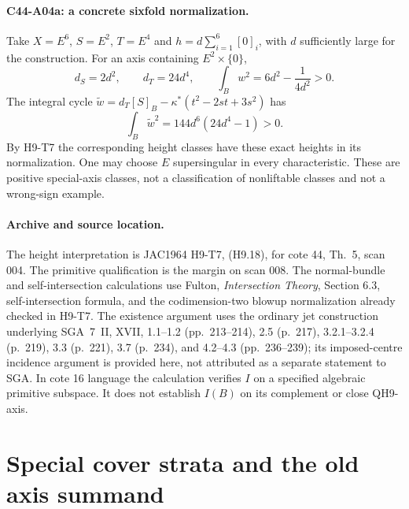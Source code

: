 \documentclass[11pt]{article}
\theoremstyle{remark}\newtheorem{remark}[theorem]{Remark}
\begin{document}
\paragraph{C44-A04a: a concrete sixfold normalization.}
Take $X=E^6$, $S=E^2$, $T=E^4$ and
$h=d\sum_{i=1}^{6}[0]_i$, with $d$ sufficiently large for the
construction. For an axis containing $E^2\times\{0\}$,
\[
 d_S=2d^2,\qquad d_T=24d^4,\qquad
 \int_Bw^2=6d^2-\frac1{4d^2}>0.
\]
The integral cycle $\widetilde w=d_T[S]_B-
\kappa^*(t^2-2st+3s^2)$ has
\[
        \int_B\widetilde w^2=144d^6(24d^4-1)>0.
\]
By H9-T7 the corresponding height classes have these exact heights
in its normalization. One may choose $E$ supersingular in every
characteristic. These are positive special-axis classes, not a
classification of nonliftable classes and not a wrong-sign example.

\paragraph{Archive and source location.}
The height interpretation is JAC1964 H9-T7, (H9.18), for cote 44,
Th.~5, scan 004. The primitive qualification is the margin on scan
008. The normal-bundle and self-intersection calculations use Fulton,
\emph{Intersection Theory}, Section 6.3, self-intersection formula,
and the codimension-two blowup normalization already checked in
H9-T7. The existence argument uses the ordinary jet construction
underlying SGA~7~II, XVII, 1.1--1.2 (pp.~213--214), 2.5
(p.~217), 3.2.1--3.2.4 (p.~219), 3.3 (p.~221), 3.7
(p.~234), and 4.2--4.3 (pp.~236--239); its imposed-centre
incidence argument is provided here, not attributed as a separate
statement to SGA. In cote 16 language the calculation verifies $I$
on a specified algebraic primitive subspace. It does not establish
$I(B)$ on its complement or close QH9-axis.


\section{Special cover strata and the old axis summand}
\end{document}
